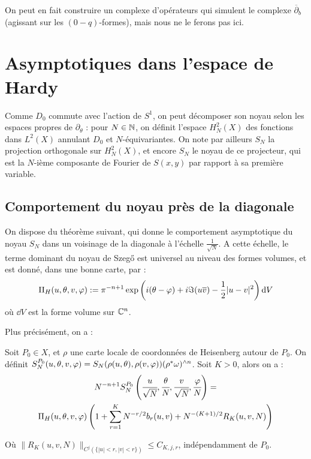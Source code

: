 On peut en fait construire un complexe d'opérateurs qui simulent le complexe $\overline{\partial}_b$ (agissant sur les $(0-q)$-formes), mais nous ne le ferons pas ici.

\section{Asymptotiques dans l'espace de Hardy}

Comme $D_0$ commute avec l'action de $S^1$, on peut décomposer son noyau selon les espaces propres de $\partial_{\theta}$ : pour $N \in \mathbb{N}$, on définit l'espace $H^2_N(X)$ des fonctions dans $L^2(X)$ annulant $D_0$ et $N$-équivariantes. On note par ailleurs  $S_N$ la projection orthogonale sur $H^2_N(X)$, et encore $S_N$ le noyau de ce projecteur, qui est la $N$-ième composante de Fourier de $S(x,y)$ par rapport à sa première variable.

\subsection{Comportement du noyau près de la diagonale}
On dispose du théorème suivant, qui donne le comportement asymptotique du noyau $S_N$ dans un voisinage de la diagonale à l'échelle $\frac{1}{\sqrt{N}}$. A cette échelle, le terme dominant du noyau de Szeg\H{o} est universel au niveau des formes volumes, et est donné, dans une bonne carte, par :
\begin{equation*}
	\Pi_H(u,\theta,v,\varphi) :=
        \pi^{-n+1}\exp\left(i(\theta-\varphi)+i\Im(u\overline{v}) -
          \frac12 |u-v|^2\right) \mathrm{d} V
\end{equation*}
où $\dd V$ est la forme volume sur $\mathbb{C}^n$.

Plus précisément, on a :
\begin{theorem}\label{thm:SZ}
	Soit $P_0 \in X$, et $\rho$ une carte locale de coordonnées de Heisenberg autour de $P_0$. On définit $S_N^{P_0}(u,\theta,v,\varphi) = S_N(\rho(u,\theta), \rho(v,\varphi)) (\rho^*\omega)^{\wedge n}$. Soit $K>0$, alors on a :
	\begin{multline*}
	N^{-n+1}S_N^{P_0}\left(\cfrac{u}{\sqrt{N}},\cfrac{\theta}{N}, \cfrac{v}{\sqrt{N}}, \cfrac{\varphi}{N}\right)= \\\Pi_H(u,\theta,v,\varphi)\left(1+\sum_{r=1}^K N^{-r/2}b_r(u,v) + N^{-(K+1)/2}R_K(u,v,N)\right)
	\end{multline*}
	
	Où $\|R_K(u,v,N)\|_{C^j(\{|u| < r, |v| < r\})} \leq C_{K,j,r}$, indépendamment de $P_0$.
\end{theorem}

